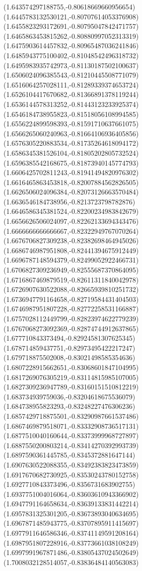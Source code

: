 \documentclass[12pt]{article}
\theoremstyle{plain}
\theoremstyle{definition}
\theoremstyle{remark}
\begin{document}
\begin{figure}
{  (1.643574297188755,-0.80618669660956654)%
  (1.6445783132530121,-0.80707614053376908)%
  (1.6455823293172691,-0.80795047842471757)%
  (1.6465863453815262,-0.80880997052313319)%
  (1.6475903614457832,-0.80965487036241846)%
  (1.6485943775100402,-0.81048542496318732)%
  (1.6495983935742973,-0.81130187502100637)%
  (1.6506024096385543,-0.81210445508771079)%
  (1.6516064257028111,-0.81289339374653724)%
  (1.6526104417670682,-0.81366891378119244)%
  (1.6536144578313252,-0.81443123233925374)%
  (1.6546184738955823,-0.81518056108994585)%
  (1.6556224899598393,-0.81591710637661075)%
  (1.6566265060240963,-0.81664106936405856)%
  (1.6576305220883534,-0.81735264618094172)%
  (1.6586345381526104,-0.81805202805732524)%
  (1.6596385542168675,-0.81873940145774793)%
  (1.6606425702811243,-0.81941494820976302)%
  (1.6616465863453818,-0.82007884562826505)%
  (1.6626506024096384,-0.82073126663570484)%
  (1.6636546184738956,-0.8213723798782876)%
  (1.6646586345381524,-0.82200234983842679)%
  (1.6656626506024097,-0.82262133694343476)%
  (1.6666666666666667,-0.82322949767070264)%
  (1.6676706827309238,-0.82382698464945026)%
  (1.6686746987951808,-0.82441394675912449)%
  (1.6696787148594379,-0.82499052922466731)%
  (1.6706827309236949,-0.82555687370864095)%
  (1.6716867469879519,-0.82611311840042978)%
  (1.6726907630522088,-0.82665939810251732)%
  (1.6736947791164658,-0.82719584431404503)%
  (1.6746987951807228,-0.82772258531166887)%
  (1.6757028112449799,-0.82823974622779239)%
  (1.6767068273092369,-0.82874744912637865)%
  (1.677710843373494,-0.82924581307625345)%
  (1.678714859437751,-0.82973495422217247)%
  (1.679718875502008,-0.83021498585354636)%
  (1.6807228915662651,-0.83068601847104995)%
  (1.6817269076305219,-0.83114815985107005)%
  (1.6827309236947789,-0.83160151510812219)%
  (1.683734939759036,-0.83204618675536079)%
  (1.684738955823293,-0.83248227476306236)%
  (1.6857429718875501,-0.83290987661537486)%
  (1.6867469879518071,-0.83332908736517131)%
  (1.6877510040160644,-0.83373999968727897)%
  (1.6887550200803214,-0.83414270392993739)%
  (1.6897590361445785,-0.8345372881647144)%
  (1.6907630522088355,-0.83492383823473859)%
  (1.6917670682730925,-0.83530243780152758)%
  (1.6927710843373496,-0.8356731683902755)%
  (1.6937751004016064,-0.83603610943366902)%
  (1.6947791164658634,-0.83639133831442214)%
  (1.6957831325301205,-0.83673893040634695)%
  (1.6967871485943775,-0.83707895911415697)%
  (1.6977911646586346,-0.83741149591208164)%
  (1.6987951807228916,-0.83773661038108249)%
  (1.6997991967871486,-0.83805437024502649)%
  (1.7008032128514057,-0.83836484140563083)%
}
\end{figure}
\end{document}
